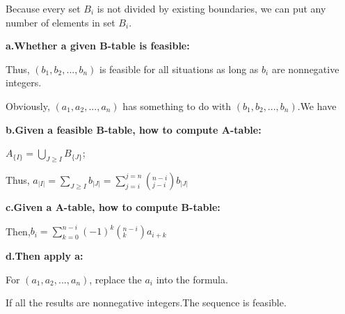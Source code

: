 \documentclass[12pt,a4]{article}
\theoremstyle{exercise}
\begin{document}
     Because every set $B_i$ is not divided by existing boundaries, we can put any number of elements in set $B_i$.
     
     \textbf{a.Whether a given B-table is feasible:}

     Thus, $(b_1,b_2,...,b_n)$ is feasible for all situations as long as $b_i$ are nonnegative integers.

     Obviously, $(a_1,a_2,...,a_n)$ has something to do with $(b_1,b_2,...,b_n)$.We have
     \begin{center}
     \textbf{b.Given a feasible B-table, how to compute A-table:}

     $A_{\{I\}}=\bigcup \limits_{J\ge I}B_{\{J\}}$;

     Thus, $a_{|I|}=\sum \limits_{J\ge I}b_{|J|}=\sum \limits_{j=i}^{j=n} (_{j-i}^{n-i}) b_{|J|}$
     
     \textbf{c.Given a A-table, how to compute B-table:}

     Then,$b_i=\sum \limits_{k=0}^{n-i} (-1)^k (_{k}^{n-i} )a_{i+k}$
     
     \end{center}

     \textbf{d.Then apply a:}
     
     For $(a_1,a_2,...,a_n)$, replace the $a_i$ into the formula.
     
     If all the results are nonnegative integers.The sequence is feasible.
     
\end{document}
